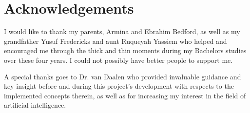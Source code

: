 
\chapter{Acknowledgements}

I would like to thank my parents, Armina and Ebrahim Bedford, as well as my grandfather Yusuf Fredericks and aunt Ruqueyah Yassiem who helped and encouraged me through the thick and thin moments during my Bachelors studies over these four years. I could not possibly have better people to support me.

A special thanks goes to Dr. van Daalen who provided invaluable guidance and key insight before and during this project's development with respects to the implemented concepts therein, as well as for increasing my interest in the field of artificial intelligence.